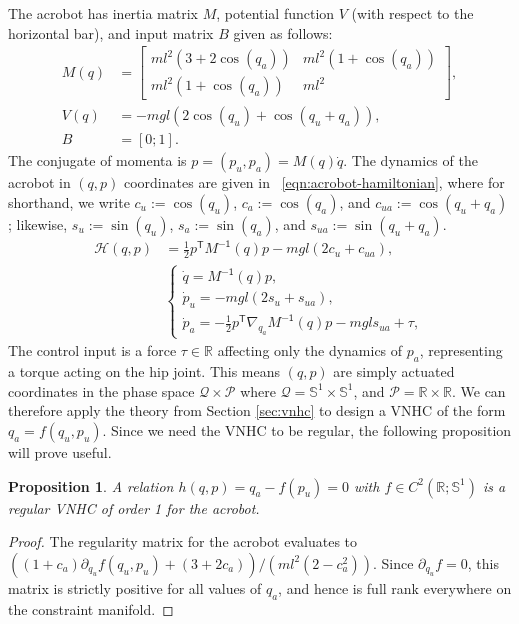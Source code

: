 \documentclass[journal,twoside,web]{ieeecolor}
\newtheorem{prop}[thm]{Proposition} %
\newcommand*{\tpose}{^\mathsf{T}}
\newcommand*{\R}{\mathbb{R}}
\newcommand*{\Sone}{\mathbb{S}^1}
\newcommand*{\Minv}{M^\mathsf{-1}}
\begin{document}
The acrobot has inertia matrix 
\(M\), potential function \(V\) (with respect to
the horizontal bar), and input matrix \(B\) given as follows:
\begin{align}\label{eqn:acrobot-inertia}
    M(q) &= \begin{bmatrix}
        ml^2\left(3+2\cos(q_a)\right) & 
        ml^2\left(1+\cos(q_a)\right) \\
        ml^2\left(1+\cos(q_a)\right) &
        ml^2
    \end{bmatrix} 
    , \\
    \label{eqn:acrobot-potential}
    V(q) &= -mgl\left(2\cos(q_u)+\cos(q_u+q_a)\right)
    , \\
    \label{eqn:acrobot-B}
    B &= [0;1]
    .
\end{align}
The conjugate of momenta is \(p = (p_u,p_a) = M(q)\dot{q}\).
The dynamics of the acrobot in \((q,p)\) coordinates are given in
~\eqref{eqn:acrobot-hamiltonian}, where
for shorthand, we write \(c_u := \cos(q_u)\), \(c_a := \cos(q_a)\), and 
\(c_{ua} := \cos(q_u + q_a)\); likewise, \(s_u := \sin(q_u)\), 
\(s_a := \sin(q_a)\), and \(s_{ua} := \sin(q_u + q_a)\).
\begin{align}\label{eqn:acrobot-hamiltonian}
    \mathcal{H}(q,p) &= \frac{1}{2}p\tpose \Minv(q) p -
    mgl\left(2 c_u + c_{ua}\right)
    , \\
     &\begin{cases}
        \dot{q} = \Minv(q) p 
        ,\\
        \dot{p}_u = -mgl\left(2s_u + s_{ua}\right) 
        ,\\
        \dot{p}_a =-\frac{1}{2}p\tpose \nabla_{q_a}\Minv(q) p
        - mgl s_{ua} + \tau,
    \end{cases} \nonumber
\end{align}
The control input is a force \(\tau \in \R\) affecting only the dynamics of
\(p_a\), representing a torque acting on the hip joint.
This means \((q,p)\) are simply actuated coordinates in the phase space
\(\mathcal{Q} \times \mathcal{P}\) where
\(\mathcal{Q} = \Sone \times \Sone\), and
\(\mathcal{P} = \R \times \R\).
We can therefore apply the theory from Section \ref{sec:vnhc} to design
a VNHC of the form \(q_a = f(q_u,p_u)\). 
Since we need the VNHC to be regular, the following proposition will prove
useful.
\begin{prop}\label{prop:acrobot-fpu-regular}
    A relation \(h(q,p) = q_a - f(p_u) = 0\) 
    with \(f \in C^2\left(\R; \Sone\right)\) is a regular
    VNHC of order 1 for the acrobot.
\end{prop}
\begin{proof}
    The regularity matrix for the acrobot evaluates to
    \(((1+c_a)\partial_{q_u}f(q_u,p_u) + (3+2c_a))/(ml^2(2-c_a^2))\).
    Since \(\partial_{q_u} f = 0\), this matrix is strictly positive for all values
    of \(q_a\), and hence is full rank everywhere on the constraint manifold.
\end{proof}
\end{document}
